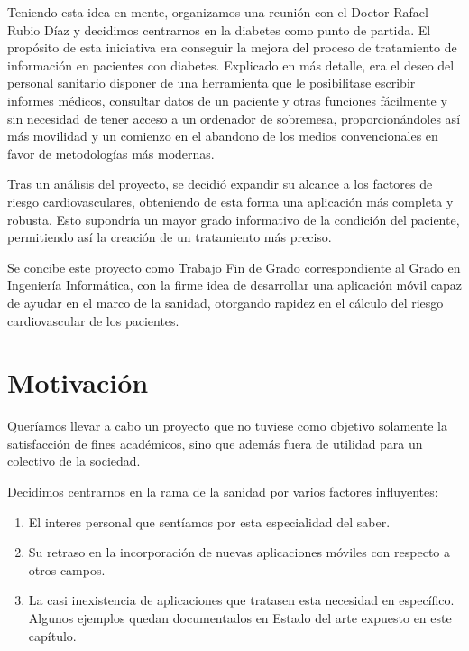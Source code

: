 \documentclass[11pt,spanish,
		listoftables,listoffigures]
		{tfgplantilla}
\begin{document}
Teniendo esta idea en mente, organizamos una reunión con el Doctor Rafael Rubio Díaz y decidimos centrarnos en la diabetes como punto de partida. El propósito de esta iniciativa era conseguir la mejora del proceso de tratamiento de información en pacientes con diabetes. Explicado en más detalle, era el deseo del personal sanitario disponer de una herramienta que le posibilitase escribir informes médicos, consultar datos de un paciente y otras funciones fácilmente y sin necesidad de tener acceso a un ordenador de sobremesa, proporcionándoles así más movilidad y un comienzo en el abandono de los medios convencionales en favor de metodologías más modernas.

Tras un análisis del proyecto, se decidió expandir su alcance a los factores de riesgo cardiovasculares, obteniendo de esta forma una aplicación más completa y robusta. Esto supondría un mayor grado informativo de la condición del paciente, permitiendo así la creación de un tratamiento más preciso.

Se concibe este proyecto como Trabajo Fin de Grado correspondiente al Grado en Ingeniería Informática, con la firme idea de desarrollar una aplicación móvil capaz de ayudar en el marco de la sanidad, otorgando rapidez en el cálculo del riesgo cardiovascular de los pacientes.

\section{Motivaci\'on}

Queríamos llevar a cabo un proyecto que no tuviese como objetivo solamente la satisfacción de fines académicos, sino que además fuera de utilidad para un colectivo de la sociedad. 

Decidimos centrarnos en la rama de la sanidad por varios factores influyentes:

\begin{enumerate}
	\item El interes personal que sentíamos por esta especialidad del saber.

	\item Su retraso en la incorporación de nuevas aplicaciones móviles con respecto a otros campos.

	\item La casi inexistencia de aplicaciones que tratasen esta necesidad en específico. Algunos ejemplos quedan documentados en \textquotedbl Estado del arte \textquotedbl{} expuesto en este capítulo.
\end{enumerate}
\end{document}
